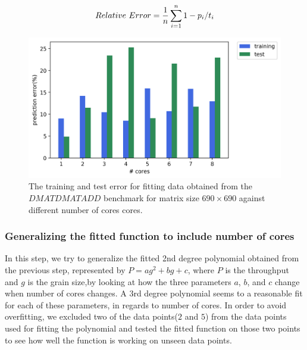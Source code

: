 \begin{equation}{\label{eq2}}
Relative\,\,Error = \frac{1}{n}\sum_{i=1}^{n} {1-p_i/t_i}
\end{equation}

\vspace{\baselineskip}	
\begin{figure}[H]
	\centering
	\includegraphics[scale=.75]{images/polyfit/fig_train_test_690.png}
	\caption{The training and test error for fitting data obtained from the $DMATDMATADD$ benchmark for matrix size $690\times690$ against different number of cores cores.}	
	\label{fig11}
\end{figure}

\vspace{\baselineskip}	
\subsubsection{Generalizing the fitted function to include number of cores}
In this step, we try to generalize the fitted 2nd degree polynomial obtained from the previous step, represented by $P=ag^2+bg+c$, where $P$ is the throughput and $g$ is the grain size,by looking at how the three parameters $a$, $b$, and $c$ change when number of cores changes. 
A $3$rd degree polynomial seems to a reasonable fit for each of these parameters, in regards to number of cores. In order to avoid overfitting, we excluded two of the data points($2$ and $5$) from the data points used for fitting the polynomial and tested the fitted function on those two points to see how well the function is working on unseen data points. 


